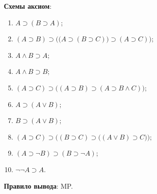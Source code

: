\textbf{Схемы аксиом}:
\begin{enumerate}[label=(А\arabic*)]
    \item $A \supset (B \supset A)$;
    \item $(A \supset B) \supset \Big(\big(A \supset (B \supset C)\big) \supset (A \supset C)\Big)$;
    \item $A \land B \supset A$;
    \item $A \land B \supset B$;
    \item $(A \supset C) \supset \big((A \supset B) \supset (A \supset B \land C)\big)$;
    \item $A \supset (A \lor B)$;
    \item $B \supset (A \lor B)$;
    \item $(A \supset C) \supset \Big((B \supset C) \supset \big((A \lor B) \supset C\big)\Big)$;
    \item $(A \supset \neg B) \supset (B \supset \neg A)$;
    \item $\neg\neg A \supset A$.
\end{enumerate}

\textbf{Правило вывода}: MP.